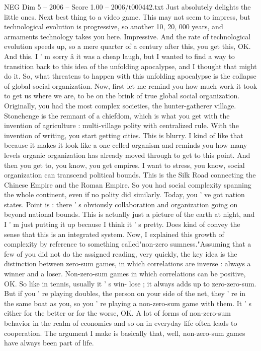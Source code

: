 \begin{textsample}{NEG Dim 5 – 2006 – Score 1.00 – 2006/t000442.txt}
Just absolutely delights the little ones.
Next best thing to a video game.
This may not seem to impress, but technological evolution is progressive, so another 10, 20, 000 years, and armaments technology takes you here.
Impressive.
And the rate of technological evolution speeds up, so a mere quarter of a century after this, you get this, OK.
And this.
I ' m sorry â it was a cheap laugh, but I wanted to find a way to transition back to this idea of the unfolding apocalypse, and I thought that might do it.
So, what threatens to happen with this unfolding apocalypse is the collapse of global social organization.
Now, first let me remind you how much work it took to get us where we are, to be on the brink of true global social organization.
Originally, you had the most complex societies, the hunter-gatherer village.
Stonehenge is the remnant of a chiefdom, which is what you get with the invention of agriculture : multi-village polity with centralized rule.
With the invention of writing, you start getting cities.
This is blurry.
I kind of like that because it makes it look like a one-celled organism and reminds you how many levels organic organization has already moved through to get to this point.
And then you get to, you know, you get empires.
I want to stress, you know, social organization can transcend political bounds.
This is the Silk Road connecting the Chinese Empire and the Roman Empire.
So you had social complexity spanning the whole continent, even if no polity did similarly.
Today, you ' ve got nation states.
Point is : there ' s obviously collaboration and organization going on beyond national bounds.
This is actually just a picture of the earth at night, and I ' m just putting it up because I think it ' s pretty.
Does kind of convey the sense that this is an integrated system.
Now, I explained this growth of complexity by reference to something called"non-zero sumness."Assuming that a few of you did not do the assigned reading, very quickly, the key idea is the distinction between zero-sum games, in which correlations are inverse : always a winner and a loser.
Non-zero-sum games in which correlations can be positive, OK.
So like in tennis, usually it ' s win- lose ; it always adds up to zero-zero-sum.
But if you ' re playing doubles, the person on your side of the net, they ' re in the same boat as you, so you ' re playing a non-zero-sum game with them.
It ' s either for the better or for the worse, OK.
A lot of forms of non-zero-sum behavior in the realm of economics and so on in everyday life often leads to cooperation.
The argument I make is basically that, well, non-zero-sum games have always been part of life.

\end{textsample}
